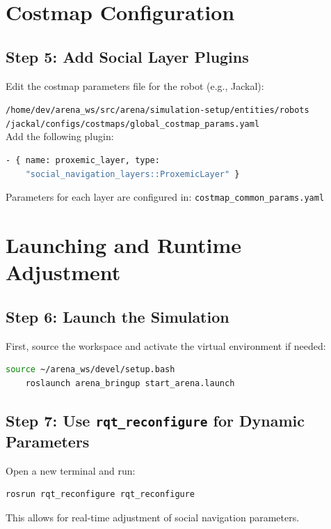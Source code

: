 \section{Costmap Configuration}

\subsection*{Step 5: Add Social Layer Plugins}
Edit the costmap parameters file for the robot (e.g., Jackal):

\texttt{/home/dev/arena\_ws/src/arena/simulation-setup/entities/robots \\
/jackal/configs/costmaps/global\_costmap\_params.yaml} \\

Add the following plugin:

\begin{lstlisting}[language=bash]
    - { name: proxemic_layer, type: 
    "social_navigation_layers::ProxemicLayer" }
\end{lstlisting}

Parameters for each layer are configured in: \texttt{costmap\_common\_params.yaml}

\section{Launching and Runtime Adjustment}
\subsection*{Step 6: Launch the Simulation}

First, source the workspace and activate the virtual environment if needed:

\begin{lstlisting}[language=bash]
    source ~/arena_ws/devel/setup.bash
    roslaunch arena_bringup start_arena.launch
\end{lstlisting}
\subsection*{Step 7: Use \texttt{rqt\_reconfigure} for Dynamic Parameters}

Open a new terminal and run:

\begin{lstlisting}[language=bash]
    rosrun rqt_reconfigure rqt_reconfigure
\end{lstlisting}

This allows for real-time adjustment of social navigation parameters.

